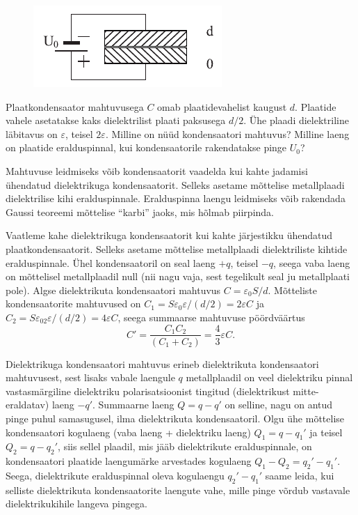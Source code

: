 
\begin{figure}
	\vspace{-13pt}
	\includegraphics[width=\linewidth]{2017-lahg-07-res-cap2.pdf}
\end{figure}

Plaatkondensaator mahtuvusega $C$ omab plaatidevahelist kaugust $d$. Plaatide vahele asetatakse kaks dielektrilist plaati paksusega $d/2$. Ühe plaadi dielektriline läbitavus on $\varepsilon$, teisel $2\varepsilon$. Milline on nüüd kondensaatori mahtuvus? Milline laeng on plaatide eralduspinnal, kui kondensaatorile rakendatakse pinge $U_0$?

\hint
Mahtuvuse leidmiseks võib kondensaatorit vaadelda kui kahte jadamisi ühendatud dielektrikuga kondensaatorit. Selleks asetame mõttelise metallplaadi dielektrilise kihi eralduspinnale. Eralduspinna laengu leidmiseks võib rakendada Gaussi teoreemi mõttelise \enquote{karbi} jaoks, mis hõlmab piirpinda.

\solu
Vaatleme kahe dielektrikuga kondensaatorit kui kahte järjestikku ühendatud plaatkondensaatorit. Selleks asetame mõttelise metallplaadi dielektriliste kihtide eralduspinnale. Ühel kondensaatoril on seal laeng $+q$, teisel $-q$, seega vaba laeng on mõttelisel metallplaadil null (nii nagu vaja, sest tegelikult seal ju metallplaati pole). Algse dielektrikuta kondensaatori mahtuvus $C=\varepsilon_0S/d$. Mõtteliste kondensaatorite mahtuvused on $C_1=S\varepsilon_0\varepsilon/(d/2)=2\varepsilon C$ ja $C_2=S\varepsilon_02\varepsilon/(d/2)=4\varepsilon C$, seega summaarse mahtuvuse pöördväärtus 
\[
C'=\frac{C_1C_2}{(C_1+C_2)}=\frac 43\varepsilon C.
\]

Dielektrikuga kondensaatori mahtuvus erineb dielektrikuta kondensaatori mahtuvusest, sest lisaks vabale laengule $q$ metallplaadil on veel dielektriku pinnal vastasmärgiline dielektriku polarisatsioonist tingitud (dielektrikust mitte-eraldatav) laeng $-q'$. Summaarne laeng $Q=q-q'$ on selline, nagu on antud pinge puhul samasugusel, ilma dielektrikuta kondensaatoril. Olgu ühe mõttelise kondensaatori kogulaeng (vaba laeng + dielektriku laeng) $Q_1=q-q_1'$ ja teisel $Q_2=q-q_2'$, siis sellel plaadil, mis jääb dielektrikute eralduspinnale, on kondensaatori plaatide laengumärke arvestades kogulaeng $Q_1-Q_2=q_2'-q_1'$. Seega, dielektrikute eralduspinnal oleva kogulaengu $q_2'-q_1'$ saame leida, kui selliste dielektrikuta kondensaatorite laengute vahe, mille pinge võrdub vastavale dielektrikukihile langeva pingega. 

